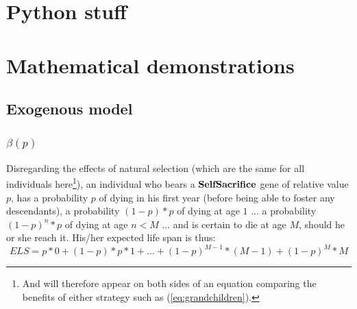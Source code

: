 \documentclass[a4paper,12pt]{report}
\begin{document}



\appendix

\chapter{Python stuff}
\label{a:scripts}
\chapter{Mathematical demonstrations}

\section{Exogenous model}
\subsection{$\beta(p)$}
\label{beta}



Disregarding the effects of natural selection (which are the same for all individuals 
here\footnote{And will therefore appear on both sides of an equation comparing
the benefits of either strategy such as (\ref{eq:grandchildren}).}),
 an individual who bears a $\bf{SelfSacrifice}$ gene of relative value $p$, has a probability $p$ of dying in his first year
 (before being able to foster any descendants), a probability $(1-p)*p$ of dying at age $1$ ...
 a probability $(1-p)^{n}*p$ of dying at age $n<M$ ... and is certain to die at age $M$, should
 he or she reach it. His/her expected life span is thus:
 \[ ELS = p*0 + (1-p)*p*1 + ... + (1-p)^{M-1}*(M-1) + (1-p)^M*M \]
\end{document}
